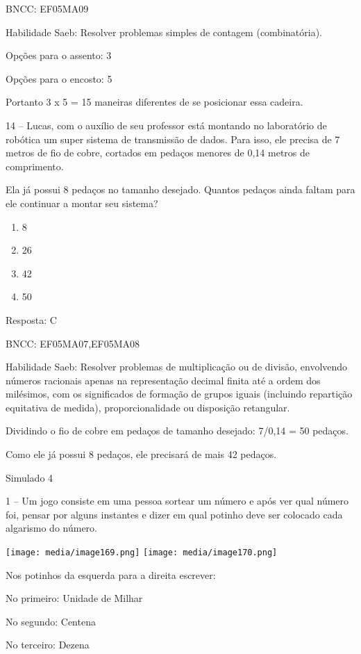 BNCC: EF05MA09

Habilidade Saeb: Resolver problemas simples de contagem (combinatória).

Opções para o assento: 3

Opções para o encosto: 5

Portanto 3 x 5 = 15 maneiras diferentes de se posicionar essa cadeira.

14 -- Lucas, com o auxílio de seu professor está montando no laboratório
de robótica um super sistema de transmissão de dados. Para isso, ele
precisa de 7 metros de fio de cobre, cortados em pedaços menores de 0,14
metros de comprimento.

Ela já possui 8 pedaços no tamanho desejado. Quantos pedaços ainda
faltam para ele continuar a montar seu sistema?

\begin{enumerate}
\def\labelenumi{\alph{enumi})}
\item
  8
\item
  26
\item
  42
\item
  50
\end{enumerate}

Resposta: C

BNCC: EF05MA07,EF05MA08

Habilidade Saeb: Resolver problemas de multiplicação ou de divisão,
envolvendo números racionais apenas na representação decimal finita até
a ordem dos milésimos, com os significados de formação de grupos iguais
(incluindo repartição equitativa de medida), proporcionalidade ou
disposição retangular.

Dividindo o fio de cobre em pedaços de tamanho desejado: 7/0,14 = 50
pedaços.

Como ele já possui 8 pedaços, ele precisará de mais 42 pedaços.

Simulado 4

1 -- Um jogo consiste em uma pessoa sortear um número e após ver qual
número foi, pensar por alguns instantes e dizer em qual potinho deve ser
colocado cada algarismo do número.

\texttt{[image: media/image169.png]}
\texttt{[image: media/image170.png]}

Nos potinhos da esquerda para a direita escrever:

No primeiro: Unidade de Milhar

No segundo: Centena

No terceiro: Dezena

